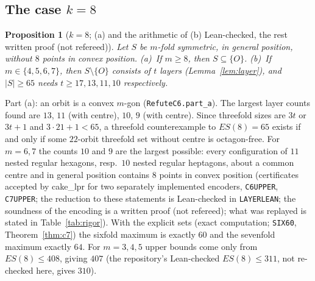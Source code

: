 \documentclass[10pt]{article}
\newtheorem{proposition}[theorem]{Proposition}
\theoremstyle{definition}
\theoremstyle{remark}
\newcommand{\dirn}[1]{{\upshape\nolinkurl{#1}}}
\newcommand{\lean}[1]{{\upshape\nolinkurl{#1}}}
\begin{document}
\subsection{The case \texorpdfstring{$k=8$}{k=8}}

\begin{proposition}[$k=8$; (a) and the arithmetic of (b) Lean-checked, the rest written proof (not refereed)]\label{prop:k8sizes}
Let $S$ be $m$-fold symmetric, in general position, without $8$ points in convex position. (a)~If $m\ge8$, then
$S\subseteq\{O\}$. (b)~If $m\in\{4,5,6,7\}$, then $S\setminus\{O\}$ consists of $t$ layers (Lemma~\ref{lem:layer}), and
$|S|\ge65$ needs $t\ge17,13,11,10$ respectively.
\end{proposition}

Part (a): an orbit is a convex $m$-gon (\lean{RefuteC6.part_a}). The largest layer counts found are $13$, $11$ (with
centre), $10$, $9$ (with centre). Since threefold sizes are $3t$ or $3t+1$ and $3\cdot21+1<65$, a threefold counterexample
to $ES(8)=65$ exists if and only if some $22$-orbit threefold set without centre is octagon-free. For $m=6,7$ the counts
$10$ and $9$ are the largest possible: every configuration of $11$ nested regular hexagons, resp.\ $10$ nested regular
heptagons, about a common centre and in general position contains $8$ points in convex position (certificates accepted by
cake\_lpr for two separately implemented encoders, \dirn{C6UPPER}, \dirn{C7UPPER}; the reduction to these statements is
Lean-checked in \dirn{LAYERLEAN}; the soundness of the encoding is a written proof (not refereed); what was replayed is
stated in Table~\ref{tab:rigor}). With the explicit sets (exact computation; \dirn{SIX60}, Theorem~\ref{thm:c7}) the
sixfold maximum is exactly $60$ and the sevenfold maximum exactly $64$. For $m=3,4,5$ upper bounds come only from
$ES(8)\le408$, giving $407$ (the repository's Lean-checked $ES(8)\le311$, not re-checked here, gives $310$).
\end{document}
